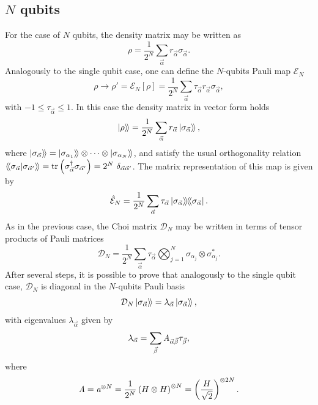 \subsection{$N$ qubits}
% 
For the case of $N$ qubits, the density matrix may be written as
% 
\begin{equation}
\rho=\frac{1}{2^N}\sum_{\vec{\alpha}} r_{\vec{\alpha}} \sigma_{\vec{\alpha}}.
\end{equation}
% 
Analogously to the single qubit case, one can define the $N$-qubits Pauli map $\mathcal{E}_N$
% 
\begin{equation}
\rho \to \rho'=\mathcal{E}_N[\rho ]=\frac{1}{2^N}\sum_{\vec{\alpha}} \tau_{\vec{\alpha}} r_{\vec{\alpha}} \sigma_{\vec{\alpha}},
\end{equation}
% 
with $-1\leq \tau_{\vec{\alpha}} \leq 1$. 
% 
In this case the density matrix in vector form holds 
% 
\begin{equation}
 \mathinner{|{\rho}\rangle \! \rangle}=\frac{1}{2^N}\sum_{\vec{\alpha}} r_{\vec{\alpha}} \mathinner{|{\sigma_{\vec{\alpha}}}\rangle \! \rangle},
\end{equation}
% 
where $\mathinner{|{\sigma_{\vec{\alpha}}}\rangle \! \rangle}=\mathinner{|{\sigma_{\alpha_1}}\rangle \! \rangle}\otimes\dots \otimes\mathinner{|{\sigma_{\alpha_N}}\rangle \! \rangle}$, and satisfy the usual orthogonality relation $\mathinner{\langle\!\langle {{\sigma_{\vec{\alpha}}}}|{{\sigma_{\vec{\alpha}'}}}\rangle\!\rangle} = \tr \left(\sigma_{\vec{\alpha}}^{\dagger} \sigma_{\vec{\alpha}'}\right) = 2^N ~\delta_{\vec{\alpha}\vec{\alpha}'}$. The matrix representation of this map is given by
% 
\begin{equation}
\hat{\mathcal{E}}_N = \frac{1}{2^N}\sum_{\vec{\alpha}} \tau_{\vec{\alpha}} \mathinner{|{\sigma_{\vec{\alpha}}}\rangle\!\rangle\!\langle\!\langle{\sigma_{\vec{\alpha}}}|}.
\end{equation}
%
As in the previous case, the Choi matrix $\mathcal{D}_N$ may be written in terms of tensor products of Pauli matrices
% 
\begin{equation}
 \mathcal{D}_N = \frac{1}{2^N}\sum_{\vec{\alpha}} \tau_{\vec{\alpha}}  \bigotimes_{j=1}^N \sigma_{\alpha_j} \otimes \sigma_{\alpha_j}^*.
\end{equation}
% 
After several steps, it is possible to prove that analogously to the single qubit case, $\mathcal{D}_N$ is diagonal in the $N$-qubits Pauli basis
%
\begin{equation}
 \mathcal{D}_N \mathinner{|{\sigma_{\vec{\alpha}}}\rangle \! \rangle}= \lambda_{\vec{\alpha}} \mathinner{|{\sigma_{\vec{\alpha}}}\rangle \! \rangle},
\end{equation}
% 
with eigenvalues $\lambda_{\vec{\alpha}}$ given by 
% 
\begin{equation}
 \lambda_{\vec{\alpha}} = \sum_{\vec{\beta}} \textit{A}_{\vec{\alpha}\vec{\beta}}\tau_{\vec{\beta}},
\end{equation}
%
where 
% 
\begin{equation}
 \textit{A}=\textit{a}^{\otimes N}=\frac{1}{2^N}\left(H\otimes H\right)^{\otimes N}=\left(\frac{H}{\sqrt{2}}\right)^{\otimes 2N}.
\end{equation}
%

